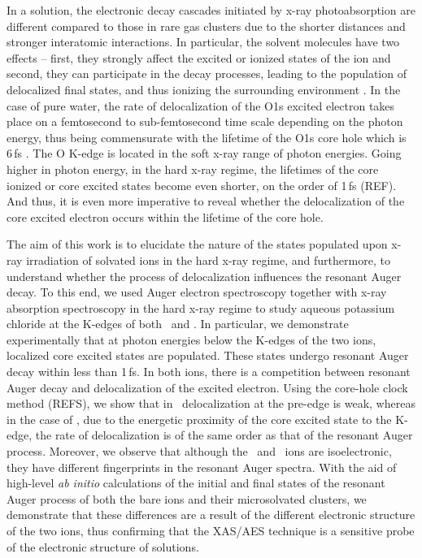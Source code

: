 In a solution, the electronic decay cascades initiated by x-ray photoabsorption are different compared to those in rare gas clusters due to the shorter distances and stronger interatomic interactions. In particular, the solvent molecules have two effects -- first, they strongly affect the excited \citep{miteva16:16671} or ionized states of the ion and second, they can participate in the decay processes, leading to the population of delocalized final states, and thus ionizing the surrounding environment \citep{Pokapanich09:7264,Pokapanich11:13430,Stumpf16:237}. 
In the case of pure water, the rate of delocalization of the O1s excited electron takes place on a femtosecond to sub-femtosecond time scale depending on the photon energy, thus being commensurate with the lifetime of the O1s core hole which is 6\,fs \citep{Nordlund07:217406}. The O K-edge is located in the soft x-ray range of photon energies. Going higher in photon energy, in the hard x-ray regime, the lifetimes of the core ionized or core excited states become even shorter, on the order of 1\,fs (REF). And thus, it is even more imperative to reveal whether the delocalization of the core excited electron occurs within the lifetime of the core hole.


The aim of this work is to elucidate the nature of the states populated upon x-ray irradiation of solvated ions in the hard x-ray regime, and furthermore, to understand whether the process of delocalization influences the resonant Auger decay. To this end, we used Auger electron spectroscopy together with x-ray absorption spectroscopy in the hard x-ray regime to study aqueous potassium chloride at the K-edges of both \ki~and \cli. In particular, we demonstrate experimentally that at photon energies below the K-edges of the two ions, localized core excited states are populated. These states undergo resonant Auger decay within less than 1\,fs. In both ions, there is a competition between resonant Auger decay and delocalization of the excited electron. Using the core-hole clock method (REFS), we show that in \ki~delocalization at the pre-edge is weak, whereas in the case of \cli, due to the energetic proximity of the core excited state to the K-edge, the rate of delocalization is of the same order as that of the resonant Auger process. Moreover, we observe that although the \ki~and \cli~ions are isoelectronic, they have different fingerprints in the resonant Auger spectra. With the aid of high-level {\it ab initio} calculations of the initial and final states of the resonant Auger process of both the bare ions and their microsolvated clusters, we demonstrate that these differences are a result of the different electronic structure of the two ions, thus confirming that the XAS/AES technique is a sensitive probe of the electronic structure of solutions.


